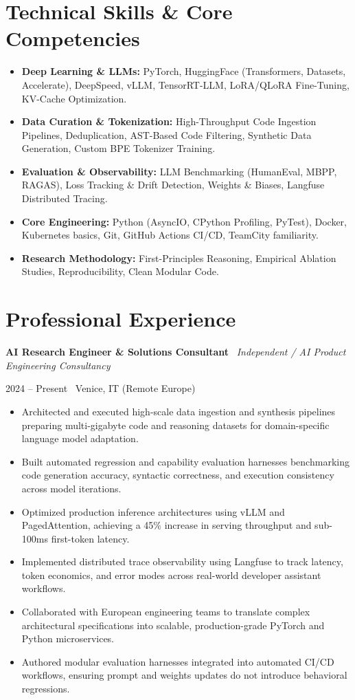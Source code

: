 \documentclass[a4paper,10pt]{article}
\newcommand{\role}[4]{%
  \vspace{2pt}\noindent
  \begin{minipage}[t]{0.70\textwidth}\raggedright\textbf{#1} \textbullet\ \textit{#3}\end{minipage}%
  \hfill
  \begin{minipage}[t]{0.28\textwidth}\raggedleft\footnotesize\color{gray}#2 \textbullet\ #4\end{minipage}%
  \vspace{1pt}%
}
\begin{document}
\section{Technical Skills \& Core Competencies}
\begin{itemize}[leftmargin=1.2em, itemsep=2pt]
  \item \textbf{Deep Learning \& LLMs:} PyTorch, HuggingFace (Transformers, Datasets, Accelerate), DeepSpeed, vLLM, TensorRT-LLM, LoRA/QLoRA Fine-Tuning, KV-Cache Optimization.
  \item \textbf{Data Curation \& Tokenization:} High-Throughput Code Ingestion Pipelines, Deduplication, AST-Based Code Filtering, Synthetic Data Generation, Custom BPE Tokenizer Training.
  \item \textbf{Evaluation \& Observability:} LLM Benchmarking (HumanEval, MBPP, RAGAS), Loss Tracking \& Drift Detection, Weights \& Biases, Langfuse Distributed Tracing.
  \item \textbf{Core Engineering:} Python (AsyncIO, CPython Profiling, PyTest), Docker, Kubernetes basics, Git, GitHub Actions CI/CD, TeamCity familiarity.
  \item \textbf{Research Methodology:} First-Principles Reasoning, Empirical Ablation Studies, Reproducibility, Clean Modular Code.
\end{itemize}

\section{Professional Experience}

\role{AI Research Engineer \& Solutions Consultant}{2024 -- Present}{Independent / AI Product Engineering Consultancy}{Venice, IT (Remote Europe)}
\begin{itemize}
  \item Architected and executed high-scale data ingestion and synthesis pipelines preparing multi-gigabyte code and reasoning datasets for domain-specific language model adaptation.
  \item Built automated regression and capability evaluation harnesses benchmarking code generation accuracy, syntactic correctness, and execution consistency across model iterations.
  \item Optimized production inference architectures using vLLM and PagedAttention, achieving a 45\% increase in serving throughput and sub-100ms first-token latency.
  \item Implemented distributed trace observability using Langfuse to track latency, token economics, and error modes across real-world developer assistant workflows.
  \item Collaborated with European engineering teams to translate complex architectural specifications into scalable, production-grade PyTorch and Python microservices.
  \item Authored modular evaluation harnesses integrated into automated CI/CD workflows, ensuring prompt and weights updates do not introduce behavioral regressions.
\end{itemize}
\end{document}
